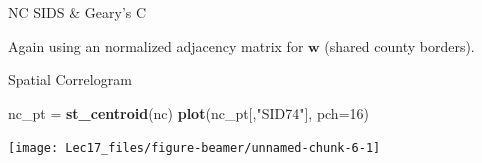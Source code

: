 \documentclass[11pt,ignorenonframetext,]{beamer}
\newenvironment{Shaded}{}{}
\newcommand{\CommentTok}[1]{\textcolor[rgb]{0.38,0.63,0.69}{\textit{#1}}}
\newcommand{\ControlFlowTok}[1]{\textcolor[rgb]{0.00,0.44,0.13}{\textbf{#1}}}
\newcommand{\DataTypeTok}[1]{\textcolor[rgb]{0.56,0.13,0.00}{#1}}
\newcommand{\DecValTok}[1]{\textcolor[rgb]{0.25,0.63,0.44}{#1}}
\newcommand{\KeywordTok}[1]{\textcolor[rgb]{0.00,0.44,0.13}{\textbf{#1}}}
\newcommand{\NormalTok}[1]{#1}
\newcommand{\OperatorTok}[1]{\textcolor[rgb]{0.40,0.40,0.40}{#1}}
\newcommand{\OtherTok}[1]{\textcolor[rgb]{0.00,0.44,0.13}{#1}}
\newcommand{\StringTok}[1]{\textcolor[rgb]{0.25,0.44,0.63}{#1}}
\let\oldShaded\Shaded
\let\endoldShaded\endShaded
\renewenvironment{Shaded}{\footnotesize\begin{spacing}{0.9}\oldShaded}{\endoldShaded\end{spacing}}
\let\oldverbatim\verbatim
\let\endoldverbatim\endverbatim
\newcommand{\scriptoutput}{
  \renewenvironment{Shaded}{\scriptsize\begin{spacing}{0.9}\oldShaded}{\endoldShaded\end{spacing}}
  \renewenvironment{verbatim}{\scriptsize\begin{spacing}{0.9}\oldverbatim}{\endoldverbatim\end{spacing}}
}
\begin{document}
\begin{frame}[fragile,t]{NC SIDS \& Geary's C}
\protect\hypertarget{nc-sids-gearys-c}{}

Again using an normalized adjacency matrix for \(\symbf{w}\) (shared
county borders).

\scriptoutput

\begin{Shaded}
\end{Shaded}

\end{frame}

\begin{frame}[fragile]{Spatial Correlogram}
\protect\hypertarget{spatial-correlogram}{}

\scriptoutput

\begin{Shaded}
\begin{Highlighting}[]
\NormalTok{nc_pt =}\StringTok{ }\KeywordTok{st_centroid}\NormalTok{(nc)}
\KeywordTok{plot}\NormalTok{(nc_pt[,}\StringTok{"SID74"}\NormalTok{], }\DataTypeTok{pch=}\DecValTok{16}\NormalTok{)}
\end{Highlighting}
\end{Shaded}

\begin{center}\texttt{[image: Lec17\_files/figure-beamer/unnamed-chunk-6-1]} \end{center}

\end{frame}
\end{document}

